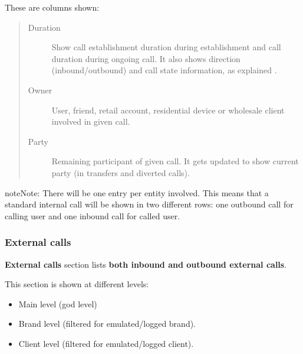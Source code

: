 \documentclass[letterpaper,10pt,english]{sphinxmanual}
\begin{document}
These are columns shown:
\begin{quote}
\begin{description}
\item[{Duration}] \leavevmode
Show call establishment duration during establishment and call duration during ongoing call. It also shows
direction (inbound/outbound) and call state information, as explained {\hyperref[administration_portal/platform/active_calls:call\string-state]{}}.

\item[{Owner}] \leavevmode
User, friend, retail account, residential device or wholesale client involved in given call.

\item[{Party}] \leavevmode
Remaining participant of given call. It gets updated to show current party (in transfers and diverted calls).

\end{description}
\end{quote}

\begin{notice}{note}{Note:}
There will be one entry per entity involved. This means that a standard internal call will be shown
in two different rows: one outbound call for calling user and one inbound call for called user.
\end{notice}


\subsubsection{External calls}
\label{administration_portal/client/wholesale/calls/external_calls::doc}\label{administration_portal/client/wholesale/calls/external_calls:external-calls}
\textbf{External calls} section lists \textbf{both inbound and outbound external calls}.

This section is shown at different levels:
\begin{itemize}
\item {} 
Main level (god level)

\item {} 
Brand level (filtered for emulated/logged brand).

\item {} 
Client level (filtered for emulated/logged client).

\end{itemize}
\end{document}
